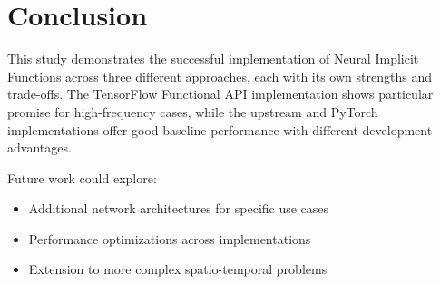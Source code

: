 \documentclass[10pt,journal,compsoc]{IEEEtran}
\begin{document}
\section{Conclusion}
This study demonstrates the successful implementation of Neural Implicit Functions across three different approaches, each with its own strengths and trade-offs. The TensorFlow Functional API implementation shows particular promise for high-frequency cases, while the upstream and PyTorch implementations offer good baseline performance with different development advantages.

Future work could explore:
\begin{itemize}
    \item Additional network architectures for specific use cases
    \item Performance optimizations across implementations
    \item Extension to more complex spatio-temporal problems
\end{itemize}



\end{document}
